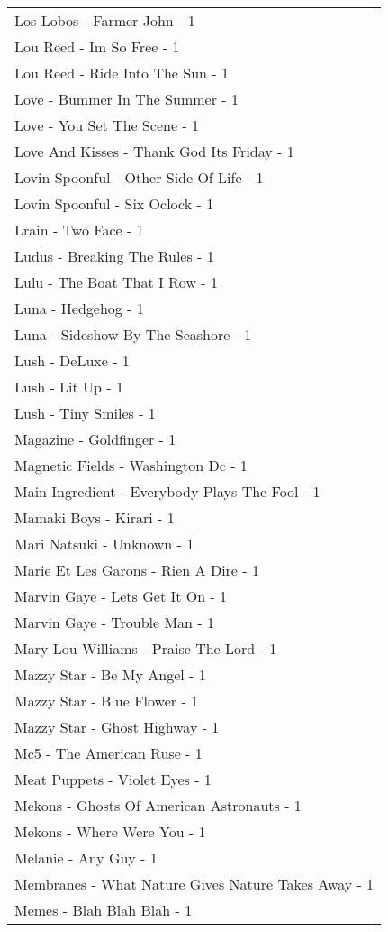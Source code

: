 \documentclass[
]{article}
\begin{document}
\begin{longtable}{l}
Los Lobos - Farmer John - 1 \\ 
Lou Reed - Im So Free - 1 \\ 
Lou Reed - Ride Into The Sun - 1 \\ 
Love - Bummer In The Summer - 1 \\ 
Love - You Set The Scene - 1 \\ 
Love And Kisses - Thank God Its Friday - 1 \\ 
Lovin Spoonful - Other Side Of Life - 1 \\ 
Lovin Spoonful - Six Oclock - 1 \\ 
Lrain - Two Face - 1 \\ 
Ludus - Breaking The Rules - 1 \\ 
Lulu - The Boat That I Row - 1 \\ 
Luna - Hedgehog - 1 \\ 
Luna - Sideshow By The Seashore - 1 \\ 
Lush - DeLuxe - 1 \\ 
Lush - Lit Up - 1 \\ 
Lush - Tiny Smiles - 1 \\ 
Magazine - Goldfinger - 1 \\ 
Magnetic Fields - Washington Dc - 1 \\ 
Main Ingredient - Everybody Plays The Fool - 1 \\ 
Mamaki Boys - Kirari - 1 \\ 
Mari Natsuki - Unknown - 1 \\ 
Marie Et Les Garons - Rien A Dire - 1 \\ 
Marvin Gaye - Lets Get It On - 1 \\ 
Marvin Gaye - Trouble Man - 1 \\ 
Mary Lou Williams - Praise The Lord - 1 \\ 
Mazzy Star - Be My Angel - 1 \\ 
Mazzy Star - Blue Flower - 1 \\ 
Mazzy Star - Ghost Highway - 1 \\ 
Mc5 - The American Ruse - 1 \\ 
Meat Puppets - Violet Eyes - 1 \\ 
Mekons - Ghosts Of American Astronauts - 1 \\ 
Mekons - Where Were You - 1 \\ 
Melanie - Any Guy - 1 \\ 
Membranes - What Nature Gives Nature Takes Away - 1 \\ 
Memes - Blah Blah Blah - 1 \\ 

\end{longtable}
\end{document}
